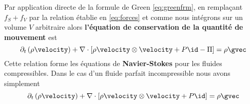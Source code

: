 \begin{refe}
Par application directe de la formule de Green \eqref{eq:greenfrm}, en remplaçant $f_S+f_V$ par la relation établie en \eqref{eq:forces} et comme nous intégrons sur un volume $V$ arbitraire alors \textbf{l'équation de conservation de la quantité de mouvement} est 
\begin{equation}
	\partial_t \left(\rho\velocity\right) + \nabla \cdot \left[ \rho \velocity \otimes \velocity +P\id - \Pi\right]  = \rho \gvec \label{eq:NSC}
\end{equation}
Cette relation forme les équations de \textbf{Navier-Stokes} pour les fluides compressibles. Dans le cas d'un fluide parfait incompressible nous avons simplement
\begin{equation}
	\partial_t \left(\rho\velocity\right) + \nabla \cdot \left[ \rho \velocity \otimes \velocity +P\id\right]  = \rho \gvec \label{eq:NSI}
\end{equation}
\end{refe}


